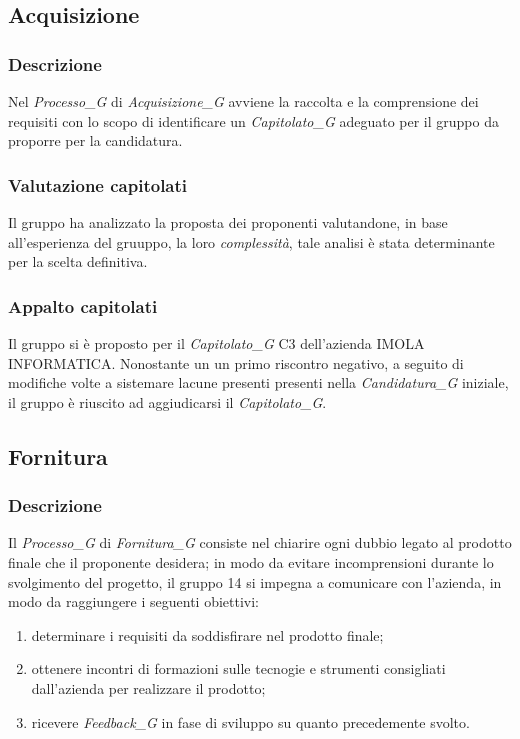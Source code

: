 \subsection{Acquisizione}
\subsubsection{Descrizione}
Nel \textit{Processo_G} di \textit{Acquisizione_G} avviene la raccolta e la comprensione dei requisiti con lo scopo di identificare un \textit{Capitolato_G} adeguato per il gruppo da proporre per la candidatura.
\subsubsection{Valutazione capitolati}
Il gruppo ha analizzato la proposta dei proponenti valutandone, in base all'esperienza del gruuppo, la loro \textit{complessità}, tale analisi è stata determinante per la scelta definitiva.
\subsubsection{Appalto capitolati}
Il gruppo si è proposto per il \textit{Capitolato_G} C3 dell'azienda IMOLA INFORMATICA. Nonostante un  un primo riscontro negativo, a seguito di modifiche volte a sistemare lacune presenti  presenti nella \textit{Candidatura_G} iniziale, il gruppo è riuscito ad aggiudicarsi il \textit{Capitolato_G}.

\subsection{Fornitura}
\subsubsection{Descrizione}
Il \textit{Processo_G} di \textit{Fornitura_G} consiste nel chiarire ogni dubbio legato al prodotto finale che il proponente desidera; in modo da evitare incomprensioni durante lo svolgimento del progetto, il gruppo 14 si impegna a comunicare con l'azienda, in modo da raggiungere i seguenti obiettivi:
\begin{enumerate}
    \item determinare i requisiti da soddisfirare nel prodotto finale;
    \item ottenere incontri di formazioni sulle tecnogie e strumenti consigliati dall'azienda per realizzare il prodotto;
    \item ricevere \textit{Feedback_G} in fase di sviluppo su quanto precedemente svolto.
\end{enumerate}
